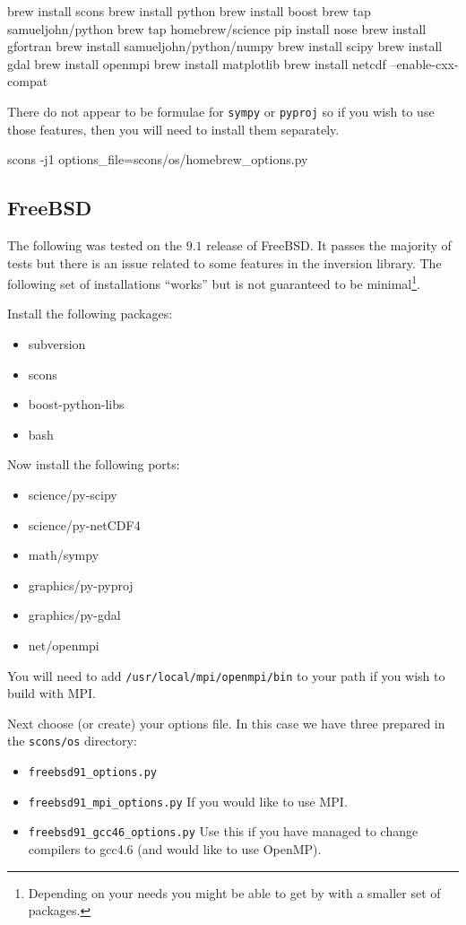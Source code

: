 \begin{shellCode}
brew install scons
brew install python
brew install boost
brew tap samueljohn/python
brew tap homebrew/science
pip install nose
brew install gfortran
brew install samueljohn/python/numpy
brew install scipy
brew install gdal
brew install openmpi
brew install matplotlib
brew install netcdf --enable-cxx-compat
\end{shellCode}

There do not appear to be formulae for \texttt{sympy} or \texttt{pyproj} so if you wish to use those features, then
you will need to install them separately.


\begin{shellCode}
scons -j1 options_file=scons/os/homebrew_options.py
\end{shellCode}


\subsection{FreeBSD}\label{sec:freebsdsrc}
The following was tested on the $9.1$ release of FreeBSD.
It passes the majority of tests but there is an issue related to some features in the inversion library.
The following set of installations ``works'' but is not guaranteed to be minimal\footnote{Depending on your needs you might be able to
get by with a smaller set of packages.}.

Install the following packages:
\begin{itemize}
 \item subversion
 \item scons
 \item boost-python-libs
 \item bash
\end{itemize}

Now install the following ports:
\begin{itemize}
 \item science/py-scipy
 \item science/py-netCDF4
 \item math/sympy
 \item graphics/py-pyproj
 \item graphics/py-gdal
 \item net/openmpi
\end{itemize}

You will need to add \texttt{/usr/local/mpi/openmpi/bin} to your path if you wish to build with MPI.

Next choose (or create) your options file.
In this case we have three prepared in the \texttt{scons/os} directory:
\begin{itemize}
 \item \texttt{freebsd91_options.py}
 \item \texttt{freebsd91_mpi_options.py}     If you would like to use MPI.
 \item \texttt{freebsd91_gcc46_options.py}   Use this if you have managed to change compilers to gcc4.6 (and would like to use OpenMP).
\end{itemize}

